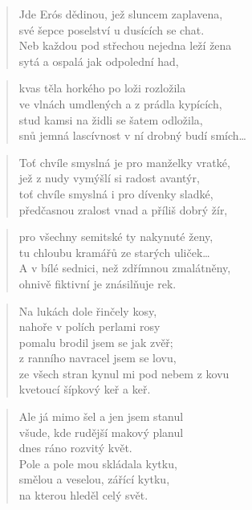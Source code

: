 \documentclass{book}
\begin{document}
\begin{verse}
Jde Erós dědinou, jež sluncem zaplavena,\\
své šepce poselství u dusících se chat.\\
Neb každou pod střechou nejedna leží žena\\
sytá a ospalá jak odpolední had,
\end{verse}
\begin{verse}
kvas těla horkého po loži rozložila\\
ve vlnách umdlených a z prádla kypících,\\
stud kamsi na židli se šatem odložila,\\
snů jemná lascívnost v ní drobný budí smích\ldots
\end{verse}
\begin{verse}
Toť chvíle smyslná je pro manželky vratké,\\
jež z nudy vymýšlí si radost avantýr,\\
toť chvíle smyslná i pro dívenky sladké,\\
předčasnou zralost vnad a příliš dobrý žír,
\end{verse}
\begin{verse}
pro všechny semitské ty nakynuté ženy,\\
tu chloubu kramářů ze starých uliček\ldots\\
A v bílé sednici, než zdřímnou zmalátněny,\\
ohnivě fiktivní je znásilňuje rek.
\end{verse}
\newpage
{}
\begin{verse}
Na lukách dole řinčely kosy,\\
nahoře v polích perlami rosy\\
pomalu brodil jsem se jak zvěř;\\
z ranního navracel jsem se lovu,\\
ze všech stran kynul mi pod nebem z kovu\\
kvetoucí šípkový keř a keř.
\end{verse}
\begin{verse}
Ale já mimo šel a jen jsem stanul\\
všude, kde rudější makový planul\\
dnes ráno rozvitý květ.\\
Pole a pole mou skládala kytku,\\
smělou a veselou, zářící kytku,\\
na kterou hleděl celý svět.
\end{verse}
\end{document}
